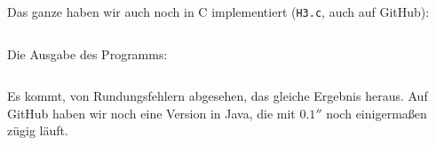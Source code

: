 \documentclass[11pt, ngerman, fleqn]{article}
\begin{document}
Das ganze haben wir auch noch in C implementiert (\texttt{H3.c}, auch auf
GitHub):

\inputminted[fontsize=\small, frame=lines, linenos, tabsize=4]{c}{H3.c}

Die Ausgabe des Programms:

\inputminted[fontsize=\small, frame=lines]{text}{H3.c.txt}

Es kommt, von Rundungsfehlern abgesehen, das gleiche Ergebnis heraus. Auf
GitHub haben wir noch eine Version in Java, die mit $\unit{0.1}\second$ noch
einigermaßen zügig läuft.

%
%
\end{document}
